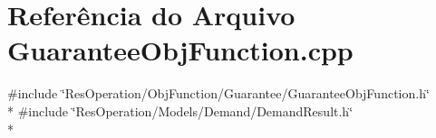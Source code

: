 \section{Referência do Arquivo Guarantee\+Obj\+Function.\+cpp}
\label{_obj_function_2_guarantee_2_guarantee_obj_function_8cpp}
{\ttfamily \#include \char`\"{}Res\+Operation/\+Obj\+Function/\+Guarantee/\+Guarantee\+Obj\+Function.\+h\char`\"{}}\\*
{\ttfamily \#include \char`\"{}Res\+Operation/\+Models/\+Demand/\+Demand\+Result.\+h\char`\"{}}\\*
